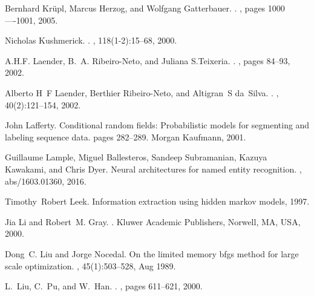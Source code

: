 \documentclass{nle}
\begin{document}
\begin{thebibliography}{}
Bernhard Kr{\"{u}}pl, Marcus Herzog, and Wolfgang Gatterbauer.
.
, pages 1000----1001, 2005.

Nicholas Kushmerick.
.
, 118(1-2):15--68, 2000.

A.H.F. Laender, B.~A. Ribeiro-Neto, and Juliana S.Teixeria.
.
, pages 84--93, 2002.

Alberto H~F Laender, Berthier Ribeiro-Neto, and Altigran~S da~Silva.
.
, 40(2):121--154, 2002.

John Lafferty.
\newblock Conditional random fields: Probabilistic models for segmenting and
  labeling sequence data.
\newblock pages 282--289. Morgan Kaufmann, 2001.

Guillaume Lample, Miguel Ballesteros, Sandeep Subramanian, Kazuya Kawakami, and
  Chris Dyer.
\newblock Neural architectures for named entity recognition.
, abs/1603.01360, 2016.

Timothy~Robert Leek.
\newblock Information extraction using hidden markov models, 1997.

Jia Li and Robert~M. Gray.
.
\newblock Kluwer Academic Publishers, Norwell, MA, USA, 2000.

Dong~C. Liu and Jorge Nocedal.
\newblock On the limited memory bfgs method for large scale optimization.
, 45(1):503--528, Aug 1989.

L.~Liu, C.~Pu, and W.~Han.
.
, pages 611--621, 2000.


\end{thebibliography}
\end{document}
